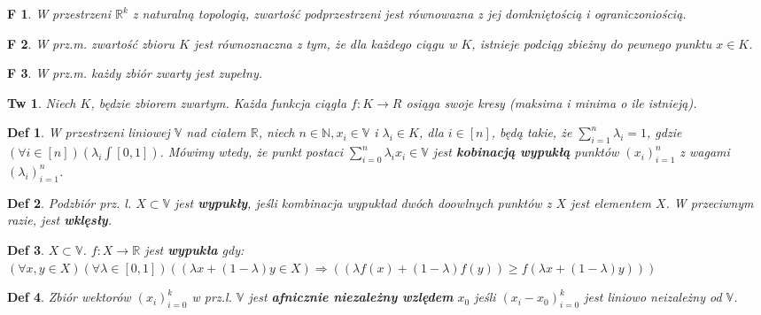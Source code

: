 \documentclass[8pt]{extarticle}
\theoremstyle{mystyle}
\newtheorem{definicja}{Def}
\newtheorem{twierdzenie}{Tw}
\newtheorem{fakt}{F}
\newcommand{\bb}{\mathbb}
\begin{document}
\begin{multicols*}{4}
    \begin{fakt}
        W przestrzeni $\bb{R}^k$ z naturalną topologią, zwartość podprzestrzeni jest równowazna z jej domkniętością i ograniczoniością.
    \end{fakt}

    \begin{fakt}
        W prz.m. zwartość zbioru $K$ jest równoznaczna z tym, że dla każdego ciągu w $K$, istnieje podciąg zbieżny do pewnego punktu $x \in K$.
    \end{fakt}

    \begin{fakt}
        W prz.m. każdy zbiór zwarty jest zupełny.
    \end{fakt}

    \begin{twierdzenie}
        Niech $K$, będzie zbiorem zwartym. Każda funkcja ciągła $f: K \rightarrow R$ osiąga swoje kresy (maksima i minima o ile istnieją).
    \end{twierdzenie}

    \begin{definicja}
        W przestrzeni liniowej $\bb{V}$ nad ciałem $\bb{R}$, niech $n \in \bb{N}, x_i \in \bb{V}$ i $\lambda_i \in K$, dla $i \in [n]$,
        będą takie, że $\sum\limits_{i=1}^{n}\lambda_i = 1$, gdzie $(\forall i \in [n])(\lambda_i \int [0, 1])$. Mówimy wtedy, że punkt postaci
        $\sum\limits_{i=0}^{n} \lambda_i x_i \in \bb{V}$ jest \textbf{kobinacją wypukłą} punktów ${(x_i)}^{n}_{i=1}$ z wagami ${(\lambda_i)}^{n}_{i=1}$.
    \end{definicja}

    \begin{definicja}
        Podzbiór prz. l. $X \subset \bb{V}$ jest \textbf{wypukły}, jeśli kombinacja wypukład dwóch doowlnych punktów z $X$ jest elementem $X$.
        W przeciwnym razie, jest \textbf{wklęsły}.
    \end{definicja}

    \begin{definicja}
        $X \subset \bb{V}$. $f: X \rightarrow \bb{R}$ jest \textbf{wypukła} gdy: 
        $(\forall x, y \in X)(\forall \lambda \in [0, 1])((\lambda x + (1 - \lambda)y \in X) \Rightarrow ((\lambda f(x) + (1 - \lambda)f(y)) \geq f(\lambda x + ( 1 - \lambda)y)))$
    \end{definicja}

    \begin{definicja}
        Zbiór wektorów ${(x_i)}^{k}_{i=0}$ w prz.l. $\bb{V}$ jest \textbf{afnicznie niezależny wzlędem} $x_0$ jeśli ${(x_i - x_0)}_{i=0}^{k}$ 
        jest liniowo neizależny od $\bb{V}$.
    \end{definicja}


\end{multicols*}
\end{document}
